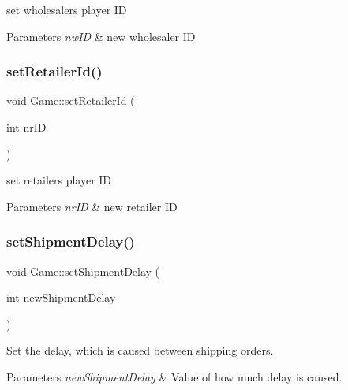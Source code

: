 set wholesaler\textquotesingle{}s player ID 
\begin{DoxyParams}{Parameters}
{\em nw\+ID} & new wholesaler ID \\
\hline
\end{DoxyParams}
\mbox{\label{classGame_a33ada7d6482601e8f5c2d16731b6ac10}} 
\subsubsection{\texorpdfstring{set\+Retailer\+Id()}{setRetailerId()}}
{\footnotesize\ttfamily void Game\+::set\+Retailer\+Id (\begin{DoxyParamCaption}\item[{int}]{nr\+ID }\end{DoxyParamCaption})}

set retailer\textquotesingle{}s player ID 
\begin{DoxyParams}{Parameters}
{\em nr\+ID} & new retailer ID \\
\hline
\end{DoxyParams}
\mbox{\label{classGame_a8c475daf7cf7752185ad5da98907c9ca}} 
\subsubsection{\texorpdfstring{set\+Shipment\+Delay()}{setShipmentDelay()}}
{\footnotesize\ttfamily void Game\+::set\+Shipment\+Delay (\begin{DoxyParamCaption}\item[{int}]{new\+Shipment\+Delay }\end{DoxyParamCaption})}

Set the delay, which is caused between shipping orders. 
\begin{DoxyParams}{Parameters}
{\em new\+Shipment\+Delay} & Value of how much delay is caused. \\
\hline
\end{DoxyParams}
\mbox{\label{classGame_acab161e982ecf8ab7b3bfb8d4927b89d}} 
